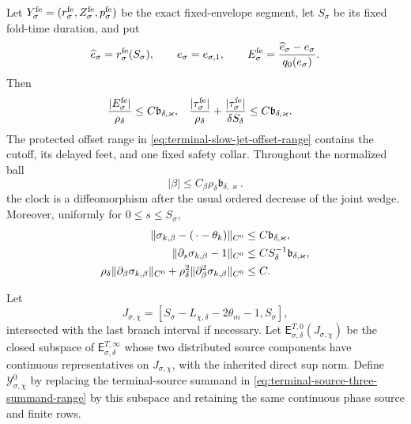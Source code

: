 \begin{corollary}
Let \(Y_\sigma^{\rm fe}=(r_\sigma^{\rm fe},Z_\sigma^{\rm fe},
p_\sigma^{\rm fe})\) be the exact fixed-envelope segment, let
\(S_\sigma\) be its fixed fold-time duration, and put
\begin{equation}
 \widehat e_\sigma=r_\sigma^{\rm fe}(S_\sigma),\qquad
 e_\sigma=e_{\sigma,1},\qquad
 E_\sigma^{\rm fe}
 =\frac{\widehat e_\sigma-e_\sigma}{q_0(e_\sigma)}.
                                                        \label{eq:fixed-envelope-original-event-defect}
\end{equation}
Then
\begin{align}
 \frac{|E_\sigma^{\rm fe}|}{\rho_\delta}
 &\le C\mathfrak b_{\delta,\varkappa},&
 \frac{|\tau_\sigma^{\rm fe}|}{\rho_\delta}
 +\frac{|\tau_\sigma^{\rm fe}|}{\delta S_\delta}
 &\le C\mathfrak b_{\delta,\varkappa}.         \label{eq:short-clock-base-defect}
\end{align}
The protected offset range in
\cref{eq:terminal-slow-jet-offset-range} contains the cutoff, its delayed
feet, and one fixed safety collar.  Throughout the normalized ball
\begin{equation}
 |\beta|\le C_\beta\rho_\delta
       \mathfrak b_{\delta,\varkappa}.           \label{eq:short-clock-parameter-ball}
\end{equation}
the clock is a diffeomorphism after the usual ordered decrease of the
joint wedge.  Moreover, uniformly for \(0\le s\le S_\sigma\),
\begin{align}
 \|\sigma_{k,\beta}-(\,\cdot-\theta_k)\|_{C^0}
 &\le C\mathfrak b_{\delta,\varkappa},\notag\\
 \|\partial_s\sigma_{k,\beta}-1\|_{C^0}
 &\le C S_\delta^{-1}\mathfrak b_{\delta,\varkappa},\notag\\
 \rho_\delta\|\partial_\beta\sigma_{k,\beta}\|_{C^0}
 +\rho_\delta^2\|\partial_\beta^2\sigma_{k,\beta}\|_{C^0}
 &\le C.                                         \label{eq:slow-clock-foot-bounds}
\end{align}

Let
\begin{equation}
 J_{\sigma,\chi}
 =[S_\sigma-L_{\chi,\delta}-2\theta_m-1,S_\sigma],         \label{eq:slow-clock-swept-window}
\end{equation}
intersected with the last branch interval if necessary.  Let
\(\mathsf E_{\sigma,\delta}^{T,0}(J_{\sigma,\chi})\) be the closed
subspace of
\(\mathsf E_{\sigma,\delta}^{T,\infty}\) whose two distributed source
components have continuous representatives on \(J_{\sigma,\chi}\), with
the inherited direct sup norm.  Define \(\mathcal Y_{\sigma,\chi}^0\) by
replacing the terminal-source summand in
\cref{eq:terminal-source-three-summand-range} by this subspace and retaining
the same continuous phase source and finite rows.


\end{corollary}
